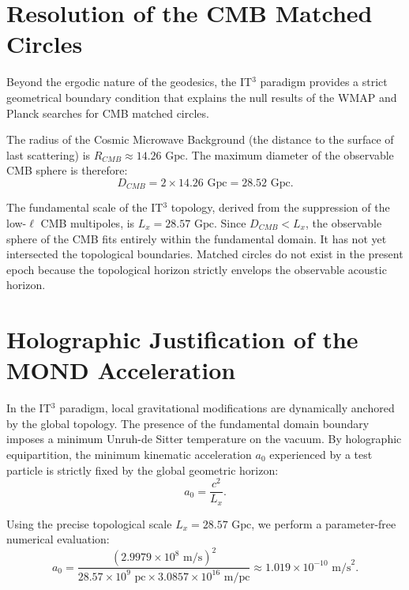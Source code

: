 \documentclass[12pt, a4paper]{article}
\begin{document}
\section{Resolution of the CMB Matched Circles}

Beyond the ergodic nature of the geodesics, the IT$^3$ paradigm provides a strict geometrical boundary condition that explains the null results of the WMAP and Planck searches for CMB matched circles.

The radius of the Cosmic Microwave Background (the distance to the surface of last scattering) is $R_{CMB} \approx 14.26 \text{ Gpc}$. The maximum diameter of the observable CMB sphere is therefore:
\begin{equation}
D_{CMB} = 2 \times 14.26 \text{ Gpc} = 28.52 \text{ Gpc}.
\end{equation}

The fundamental scale of the IT$^3$ topology, derived from the suppression of the low-$\ell$ CMB multipoles, is $L_x = 28.57 \text{ Gpc}$. Since $D_{CMB} < L_x$, the observable sphere of the CMB fits entirely within the fundamental domain. It has not yet intersected the topological boundaries. Matched circles do not exist in the present epoch because the topological horizon strictly envelops the observable acoustic horizon.

\section{Holographic Justification of the MOND Acceleration}

In the IT$^3$ paradigm, local gravitational modifications are dynamically anchored by the global topology. The presence of the fundamental domain boundary imposes a minimum Unruh-de Sitter temperature on the vacuum. By holographic equipartition, the minimum kinematic acceleration $a_0$ experienced by a test particle is strictly fixed by the global geometric horizon:
\begin{equation}
a_0 = \frac{c^2}{L_x}.
\end{equation}

Using the precise topological scale $L_x = 28.57 \text{ Gpc}$, we perform a parameter-free numerical evaluation:
\begin{equation}
a_0 = \frac{(2.9979 \times 10^8 \text{ m/s})^2}{28.57 \times 10^9 \text{ pc} \times 3.0857 \times 10^{16} \text{ m/pc}} \approx 1.019 \times 10^{-10} \text{ m/s}^2.
\end{equation}
\end{document}
